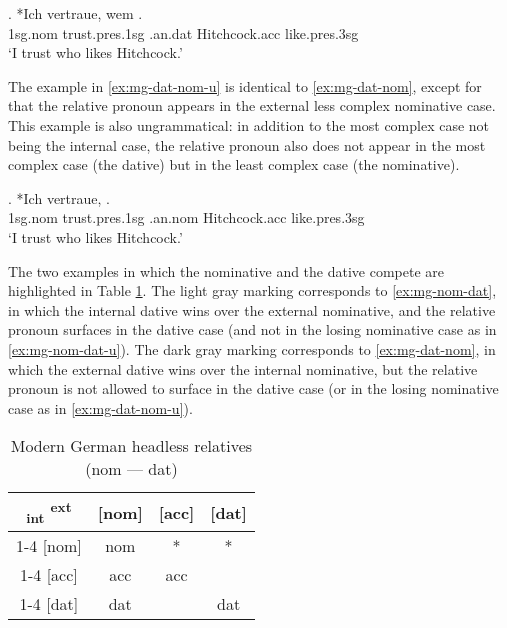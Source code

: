 \exg. *Ich vertraue, wem  .\\
1\ac{sg}.\ac{nom} trust.\ac{pres}.1\ac{sg}\scsub{[dat]} .\ac{an}.\ac{dat} Hitchcock.\ac{acc} like.\ac{pres}.3\ac{sg}\scsub{[nom]}\\
`I trust who likes Hitchcock.' \label{ex:mg-dat-nom}

The example in \ref{ex:mg-dat-nom-u} is identical to \ref{ex:mg-dat-nom}, except for that the relative pronoun appears in the external less complex nominative case. This example is also ungrammatical: in addition to the most complex case not being the internal case, the relative pronoun also does not appear in the most complex case (the dative) but in the least complex case (the nominative).

\exg. *Ich vertraue,   .\\
1\ac{sg}.\ac{nom} trust.\ac{pres}.1\ac{sg}\scsub{[dat]} .\ac{an}.\ac{nom} Hitchcock.\ac{acc} like.\ac{pres}.3\ac{sg}\scsub{[nom]}\\
`I trust who likes Hitchcock.' \label{ex:mg-dat-nom-u}

The two examples in which the nominative and the dative compete are highlighted in Table \ref{tbl:case-competition-mg-nom-dat}.
The light gray marking corresponds to \ref{ex:mg-nom-dat}, in which the internal dative wins over the external nominative, and the relative pronoun surfaces in the dative case (and not in the losing nominative case as in \ref{ex:mg-nom-dat-u}).
The dark gray marking corresponds to \ref{ex:mg-dat-nom}, in which the external dative wins over the internal nominative, but the relative pronoun is not allowed to surface in the dative case (or in the losing nominative case as in \ref{ex:mg-dat-nom-u}).

\begin{table}[ht]
  \center
  \caption{Modern German headless relatives (\ac{nom} --- \ac{dat})}
  \begin{tabular}{c|c|c|c}
    \toprule
    \textsubscript{\ac{int}} \textsuperscript{\ac{ext}}
           & [\ac{nom}]
           & [\ac{acc}]
           & [\ac{dat}]
           \\ \cmidrule{1-4}
       [\ac{nom}]
           & \ac{nom}
           & *
           & \cellcolor{DG}*
           \\ \cmidrule{1-4}
       [\ac{acc}]
           & \ac{acc}
           & \ac{acc}
           &
           \\ \cmidrule{1-4}
       [\ac{dat}]
           & \cellcolor{LG}\ac{dat}
           &
           & \ac{dat}
           \\
     \bottomrule
  \end{tabular}
    \label{tbl:case-competition-mg-nom-dat}
\end{table}

